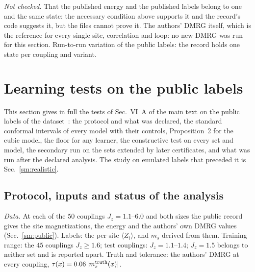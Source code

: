 \documentclass[aps,prx,onecolumn,10pt,nofootinbib,longbibliography,floatfix]{revtex4-2}
\theoremstyle{remark}
\newcommand{\Jz}{J_z}
\newcommand{\ms}{m_s}
\begin{document}
\emph{Not checked.} That the published energy and the published labels belong to one and the same state: the
necessary condition above supports it and the record's code suggests it, but the files cannot prove it. The
authors' DMRG itself, which is the reference for every single site, correlation and loop: no new DMRG was run for
this section. Run-to-run variation of the public labels: the record holds one state per coupling and variant.
\section{Learning tests on the public labels}
\label{sm:publiclearn}

This section gives in full the tests of Sec.~VI~A of the main text on the public labels of the
dataset~\cite{jaderberg2026data}: the protocol and what was declared, the standard conformal intervals of every
model with their controls, Proposition~2 for the cubic model, the floor for any learner, the constructive test on %
every set and model, the secondary run on the sets extended by later certificates, and what was run after the declared analysis. The
study on emulated labels that preceded it is Sec.~\ref{sm:realistic}.

\subsection{Protocol, inputs and status of the analysis}

\emph{Data.} At each of the $50$ couplings $\Jz=1.1$--$6.0$ and both sizes the public record gives the site %
magnetizations, the energy and the authors' own DMRG values (Sec.~\ref{sm:public}). Labels: the per-site
$\langle Z_i\rangle$, and $\ms$ derived from them. Training range: the $45$ couplings $\Jz\ge1.6$; test couplings: %
$\Jz=1.1$--$1.4$; $\Jz=1.5$ belongs to neither set and is reported apart. Truth and tolerance: the authors' DMRG %
at every coupling, $\tau(x)=0.06\,|\ms^{\rm truth}(x)|$. %
\end{document}
